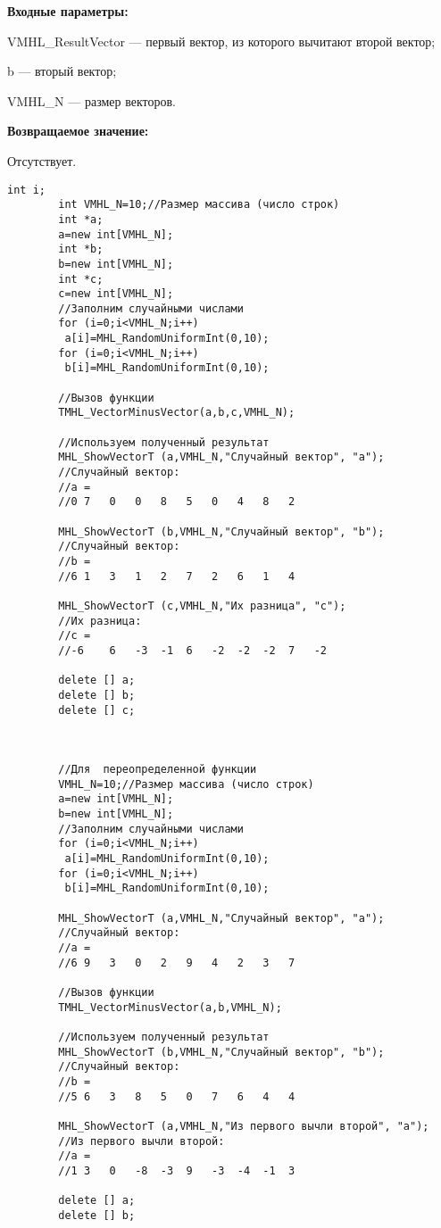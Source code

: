 \documentclass[a4paper,12pt]{article}
\begin{document}
\textbf{Входные параметры:}

 VMHL\_ResultVector --- первый вектор, из которого вычитают второй вектор;
  
 b --- вторый вектор;
 
 VMHL\_N --- размер векторов.

\textbf{Возвращаемое значение:}

Отсутствует.


\begin{lstlisting}[label=code_use_TMHL_VectorMinusVector,caption=Пример использования]
        int i;
        int VMHL_N=10;//Размер массива (число строк)
        int *a;
        a=new int[VMHL_N];
        int *b;
        b=new int[VMHL_N];
        int *c;
        c=new int[VMHL_N];
        //Заполним случайными числами
        for (i=0;i<VMHL_N;i++)
         a[i]=MHL_RandomUniformInt(0,10);
        for (i=0;i<VMHL_N;i++)
         b[i]=MHL_RandomUniformInt(0,10);

        //Вызов функции
        TMHL_VectorMinusVector(a,b,c,VMHL_N);

        //Используем полученный результат
        MHL_ShowVectorT (a,VMHL_N,"Случайный вектор", "a");
        //Случайный вектор:
        //a =
        //0	7	0	0	8	5	0	4	8	2

        MHL_ShowVectorT (b,VMHL_N,"Случайный вектор", "b");
        //Случайный вектор:
        //b =
        //6	1	3	1	2	7	2	6	1	4

        MHL_ShowVectorT (c,VMHL_N,"Их разница", "c");
        //Их разница:
        //c =
        //-6	6	-3	-1	6	-2	-2	-2	7	-2

        delete [] a;
        delete [] b;
        delete [] c;
		
		
		
		//Для  переопределенной функции
        VMHL_N=10;//Размер массива (число строк)
        a=new int[VMHL_N];
        b=new int[VMHL_N];
        //Заполним случайными числами
        for (i=0;i<VMHL_N;i++)
         a[i]=MHL_RandomUniformInt(0,10);
        for (i=0;i<VMHL_N;i++)
         b[i]=MHL_RandomUniformInt(0,10);

        MHL_ShowVectorT (a,VMHL_N,"Случайный вектор", "a");
        //Случайный вектор:
        //a =	
        //6	9	3	0	2	9	4	2	3	7

        //Вызов функции
        TMHL_VectorMinusVector(a,b,VMHL_N);

        //Используем полученный результат
        MHL_ShowVectorT (b,VMHL_N,"Случайный вектор", "b");
        //Случайный вектор:
        //b =	
        //5	6	3	8	5	0	7	6	4	4
        
        MHL_ShowVectorT (a,VMHL_N,"Из первого вычли второй", "a");
        //Из первого вычли второй:
        //a =	
        //1	3	0	-8	-3	9	-3	-4	-1	3         
        
        delete [] a;
        delete [] b;
\end{lstlisting}
\end{document}
